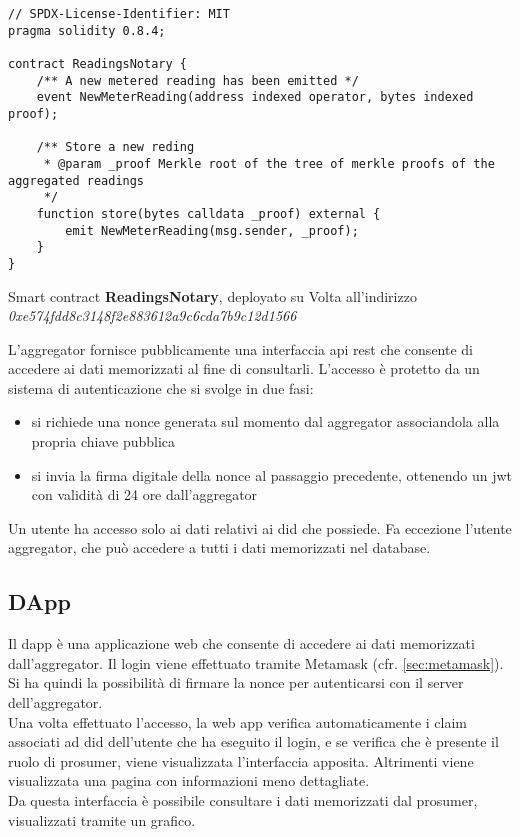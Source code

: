 \begin{listing}[h]
    \begin{verbatim}
// SPDX-License-Identifier: MIT
pragma solidity 0.8.4;

contract ReadingsNotary {
    /** A new metered reading has been emitted */
    event NewMeterReading(address indexed operator, bytes indexed proof);

    /** Store a new reding
     * @param _proof Merkle root of the tree of merkle proofs of the aggregated readings
     */
    function store(bytes calldata _proof) external {
        emit NewMeterReading(msg.sender, _proof);
    }
}
\end{verbatim}
    \caption{Smart contract \textbf{ReadingsNotary}, deployato su Volta all'indirizzo \textit{0xe574fdd8c3148f2e883612a9c6cda7b9c12d1566}}\label{lab:readings-notary}
\end{listing}

L'\gls{aggregator} fornisce pubblicamente una interfaccia \gls{api} \gls{rest} che consente di accedere ai dati memorizzati al fine di consultarli.
L'accesso è protetto da un sistema di autenticazione che si svolge in due fasi:
\begin{itemize}
    \item si richiede una nonce generata sul momento dal \gls{aggregator} associandola alla propria chiave pubblica
    \item si invia la firma digitale della nonce al passaggio precedente, ottenendo un \gls{jwt} con validità di 24 ore dall'\gls{aggregator}
\end{itemize}

Un utente ha accesso solo ai dati relativi ai \gls{did} che possiede.
Fa eccezione l'utente \gls{aggregator}, che può accedere a tutti i dati memorizzati nel database.

\subsection{DApp}
Il \gls{dapp} è una applicazione web che consente di accedere ai dati memorizzati dall'\gls{aggregator}.
Il login viene effettuato tramite Metamask (cfr. \autoref{sec:metamask}).
Si ha quindi la possibilità di firmare la nonce per autenticarsi con il server dell'\gls{aggregator}. \\
Una volta effettuato l'accesso, la web app verifica automaticamente i claim associati ad \gls{did} dell'utente
che ha eseguito il login, e se verifica che è presente il ruolo di \gls{prosumer}, viene visualizzata l'interfaccia apposita.
Altrimenti viene visualizzata una pagina con informazioni meno dettagliate. \\
Da questa interfaccia è possibile consultare i dati memorizzati dal prosumer, visualizzati tramite un grafico.

